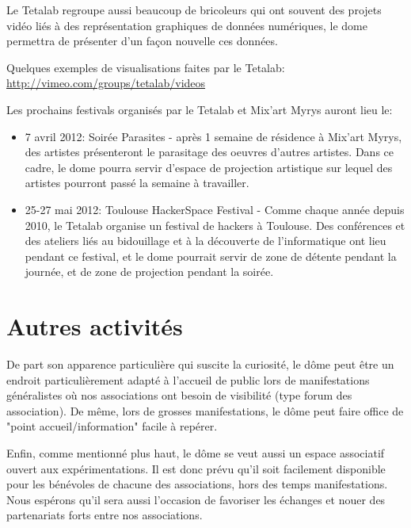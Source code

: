 \documentclass[a4paper,12pt]{report}
\begin{document}
Le Tetalab regroupe aussi beaucoup de bricoleurs qui ont souvent des projets vidéo
liés à des représentation graphiques de données numériques, le dome permettra de 
présenter d'un façon nouvelle ces données.

Quelques exemples de visualisations faites par le Tetalab:
\url{http://vimeo.com/groups/tetalab/videos}

Les prochains festivals organisés par le Tetalab et Mix'art Myrys auront lieu le:

\begin{itemize}
  \item 7 avril 2012: Soirée Parasites - après 1 semaine de résidence à Mix'art Myrys, des artistes 
  présenteront le parasitage des oeuvres d'autres artistes. Dans ce cadre, le dome pourra servir 
  d'espace de projection artistique sur lequel des artistes pourront passé la semaine à travailler.

  \item 25-27 mai 2012: Toulouse HackerSpace Festival - Comme chaque année depuis 2010, le Tetalab
  organise un festival de hackers à Toulouse. Des conférences et des ateliers liés au bidouillage
  et à la découverte de l'informatique ont lieu pendant ce festival, et le dome pourrait servir de
  zone de détente pendant la journée, et de zone de projection pendant la soirée.
\end{itemize}

\section{Autres activités}

De part son apparence particulière qui suscite la curiosité, le dôme peut être
un endroit particulièrement adapté à l'accueil de public lors de manifestations
généralistes où nos associations ont besoin de visibilité (type forum des
association). De même, lors de grosses manifestations, le dôme peut faire
office de "point accueil/information" facile à repérer.

Enfin, comme mentionné plus haut, le dôme se veut aussi un espace associatif
ouvert aux expérimentations. Il est donc prévu qu'il soit facilement disponible
pour les bénévoles de chacune des associations, hors des temps manifestations.
Nous espérons qu'il sera aussi l'occasion de favoriser les échanges et nouer
des partenariats forts entre nos associations.
\end{document}
